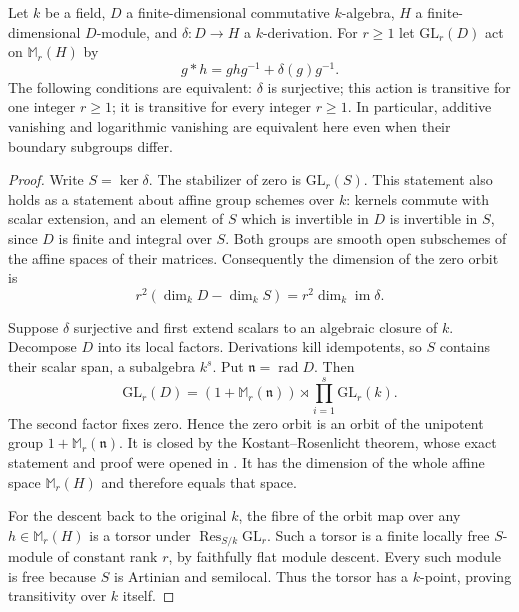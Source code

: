 \begin{lemma}
\label{A4:derivation-orbits}
Let $k$ be a field, $D$ a finite-dimensional commutative $k$-algebra,
$H$ a finite-dimensional $D$-module, and $\delta:D\to H$ a $k$-derivation.
For $r\geq1$ let $\mathrm{GL}_r(D)$ act on $\mathbb M_r(H)$ by
\[
       g*h=g h g^{-1}+\delta(g)g^{-1}.
\]
The following conditions are equivalent: $\delta$ is surjective; this
action is transitive for one integer $r\geq1$; it is transitive for every
integer $r\geq1$.  In particular, additive vanishing and logarithmic
vanishing are equivalent here even when their boundary subgroups differ.
\end{lemma}
\begin{proof}
Write $S=\ker\delta$.  The stabilizer of zero is $\mathrm{GL}_r(S)$.
This statement also holds as a statement about affine group schemes over
$k$: kernels commute with scalar extension, and an element of $S$ which
is invertible in $D$ is invertible in $S$, since $D$ is finite and integral
over $S$.  Both groups are smooth open subschemes of the affine spaces
of their matrices.  Consequently the dimension of the zero orbit is
\[
       r^2(\dim_k D-\dim_k S)=r^2\dim_k\operatorname{im}\delta.
\]

Suppose $\delta$ surjective and first extend scalars to an algebraic
closure of $k$.  Decompose $D$ into its local factors.  Derivations kill
idempotents, so $S$ contains their scalar span, a subalgebra $k^s$.
Put $\mathfrak n=\operatorname{rad}D$.  Then
\[
 \mathrm{GL}_r(D)=
 (1+\mathbb M_r(\mathfrak n))\rtimes\prod_{i=1}^s\mathrm{GL}_r(k).
\]
The second factor fixes zero.  Hence the zero orbit is an orbit of the
unipotent group $1+\mathbb M_r(\mathfrak n)$.  It is closed by the
Kostant--Rosenlicht theorem, whose exact statement and proof were opened
in \cite[Theorem 17.64, p.~374]{MilneAG}.  It has the dimension of the
whole affine space $\mathbb M_r(H)$ and therefore equals that space.

For the descent back to the original $k$, the fibre of the orbit map
over any $h\in\mathbb M_r(H)$ is a torsor under
$\operatorname{Res}_{S/k}\mathrm{GL}_r$.  Such a torsor is a finite
locally free $S$-module of constant rank $r$, by faithfully flat module
descent.  Every such module is free because $S$ is Artinian and semilocal.
Thus the torsor has a $k$-point, proving transitivity over $k$ itself.


\end{proof}
